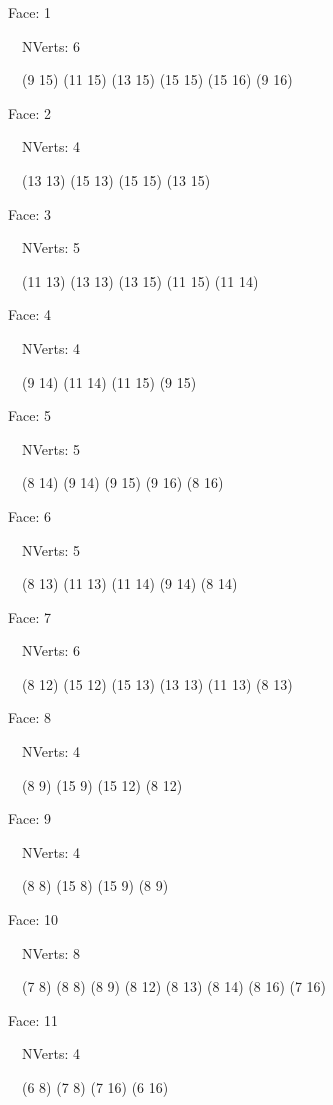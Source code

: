 \documentclass{article}
\begin{document}
{\footnotesize 

Face: 1

\   \    NVerts: 6

 \   \   (9 15) (11 15) (13 15) (15 15) (15 16) (9 16)}

{\footnotesize 

Face: 2

\   \    NVerts: 4

 \   \   (13 13) (15 13) (15 15) (13 15)}

{\footnotesize 

Face: 3

\   \    NVerts: 5

 \   \   (11 13) (13 13) (13 15) (11 15) (11 14)}

{\footnotesize 

Face: 4

\   \    NVerts: 4

 \   \   (9 14) (11 14) (11 15) (9 15)}

{\footnotesize 

Face: 5

\   \    NVerts: 5

 \   \   (8 14) (9 14) (9 15) (9 16) (8 16)}

{\footnotesize 

Face: 6

\   \    NVerts: 5

 \   \   (8 13) (11 13) (11 14) (9 14) (8 14)}

{\footnotesize 

Face: 7

\   \    NVerts: 6

 \   \   (8 12) (15 12) (15 13) (13 13) (11 13) (8 13)}

{\footnotesize 

Face: 8

\   \    NVerts: 4

 \   \   (8 9) (15 9) (15 12) (8 12)}

{\footnotesize 

Face: 9

\   \    NVerts: 4

 \   \   (8 8) (15 8) (15 9) (8 9)}

{\footnotesize 

Face: 10

\   \    NVerts: 8

 \   \   (7 8) (8 8) (8 9) (8 12) (8 13) (8 14) (8 16) (7 16)}

{\footnotesize 

Face: 11

\   \    NVerts: 4

 \   \   (6 8) (7 8) (7 16) (6 16)}
\end{document}
